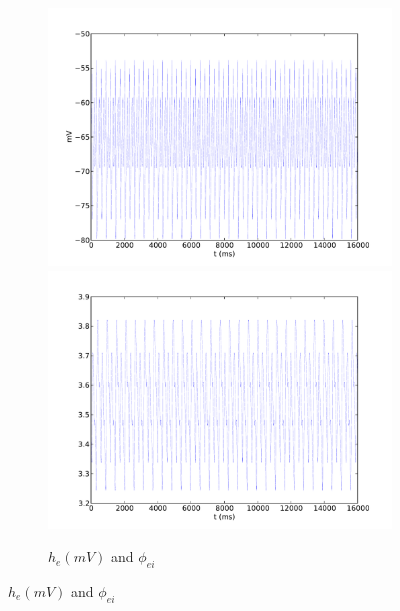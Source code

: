 \documentclass[a4paper,12pt]{article}
\begin{document}
\begin{figure}
	\begin{subfigure}[b]{1\textwidth}
		\includegraphics[scale=0.32]{chosen-frontiers-2012/00214-1-0_1-5-0_2-he-phi.pdf}
		\includegraphics[scale=0.32]{chosen-frontiers-2012/00214-1-0_1-5-0_2-phi_ei-phi}
		\label{fig:214-1-0_1-5-0_2}
		\caption{$h_e (mV)$ and $\phi_{ei}$}
	\end{subfigure}


\end{figure}
\end{document}
